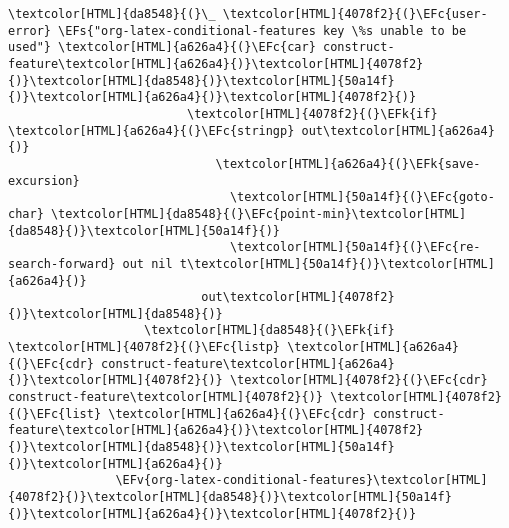 \documentclass{scrartcl}
\newcommand{\EFk}[1]{\textcolor{EFk}{#1}} %
\newcommand{\EFs}[1]{\textcolor{EFs}{#1}} %
\newcommand{\EFc}[1]{\textcolor{EFc}{#1}} %
\newcommand{\EFv}[1]{\textcolor{EFv}{#1}} %
\begin{document}
\begin{enumerate}
\begin{Code}
\begin{Verbatim}[]
                                    \textcolor[HTML]{da8548}{(}\_ \textcolor[HTML]{4078f2}{(}\EFc{user-error} \EFs{"org-latex-conditional-features key \%s unable to be used"} \textcolor[HTML]{a626a4}{(}\EFc{car} construct-feature\textcolor[HTML]{a626a4}{)}\textcolor[HTML]{4078f2}{)}\textcolor[HTML]{da8548}{)}\textcolor[HTML]{50a14f}{)}\textcolor[HTML]{a626a4}{)}\textcolor[HTML]{4078f2}{)}
                         \textcolor[HTML]{4078f2}{(}\EFk{if} \textcolor[HTML]{a626a4}{(}\EFc{stringp} out\textcolor[HTML]{a626a4}{)}
                             \textcolor[HTML]{a626a4}{(}\EFk{save-excursion}
                               \textcolor[HTML]{50a14f}{(}\EFc{goto-char} \textcolor[HTML]{da8548}{(}\EFc{point-min}\textcolor[HTML]{da8548}{)}\textcolor[HTML]{50a14f}{)}
                               \textcolor[HTML]{50a14f}{(}\EFc{re-search-forward} out nil t\textcolor[HTML]{50a14f}{)}\textcolor[HTML]{a626a4}{)}
                           out\textcolor[HTML]{4078f2}{)}\textcolor[HTML]{da8548}{)}
                   \textcolor[HTML]{da8548}{(}\EFk{if} \textcolor[HTML]{4078f2}{(}\EFc{listp} \textcolor[HTML]{a626a4}{(}\EFc{cdr} construct-feature\textcolor[HTML]{a626a4}{)}\textcolor[HTML]{4078f2}{)} \textcolor[HTML]{4078f2}{(}\EFc{cdr} construct-feature\textcolor[HTML]{4078f2}{)} \textcolor[HTML]{4078f2}{(}\EFc{list} \textcolor[HTML]{a626a4}{(}\EFc{cdr} construct-feature\textcolor[HTML]{a626a4}{)}\textcolor[HTML]{4078f2}{)}\textcolor[HTML]{da8548}{)}\textcolor[HTML]{50a14f}{)}\textcolor[HTML]{a626a4}{)}
               \EFv{org-latex-conditional-features}\textcolor[HTML]{4078f2}{)}\textcolor[HTML]{da8548}{)}\textcolor[HTML]{50a14f}{)}\textcolor[HTML]{a626a4}{)}\textcolor[HTML]{4078f2}{)}
\end{Verbatim}
\end{Code}


\end{enumerate}
\end{document}
